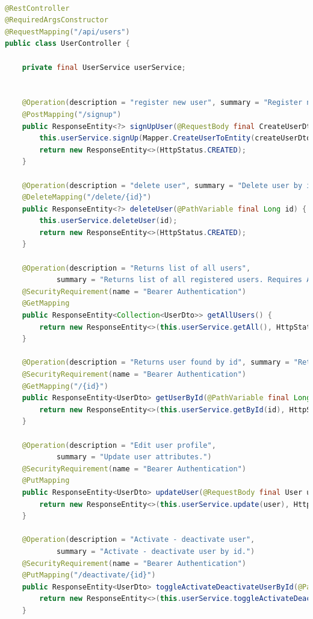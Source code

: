 \documentclass[a4paper,12pt,oneside]{article}
\begin{document}
\begin{lstlisting}[language=Java]

@RestController
@RequiredArgsConstructor
@RequestMapping("/api/users")
public class UserController {

    private final UserService userService;


    @Operation(description = "register new user", summary = "Register new user with provided attributes.")
    @PostMapping("/signup")
    public ResponseEntity<?> signUpUser(@RequestBody final CreateUserDto createUserDto) {
        this.userService.signUp(Mapper.CreateUserToEntity(createUserDto));
        return new ResponseEntity<>(HttpStatus.CREATED);
    }

    @Operation(description = "delete user", summary = "Delete user by id.")
    @DeleteMapping("/delete/{id}")
    public ResponseEntity<?> deleteUser(@PathVariable final Long id) {
        this.userService.deleteUser(id);
        return new ResponseEntity<>(HttpStatus.CREATED);
    }

    @Operation(description = "Returns list of all users",
            summary = "Returns list of all registered users. Requires Admin rights")
    @SecurityRequirement(name = "Bearer Authentication")
    @GetMapping
    public ResponseEntity<Collection<UserDto>> getAllUsers() {
        return new ResponseEntity<>(this.userService.getAll(), HttpStatus.OK);
    }

    @Operation(description = "Returns user found by id", summary = "Returns user found by id.")
    @SecurityRequirement(name = "Bearer Authentication")
    @GetMapping("/{id}")
    public ResponseEntity<UserDto> getUserById(@PathVariable final Long id) {
        return new ResponseEntity<>(this.userService.getById(id), HttpStatus.OK);
    }

    @Operation(description = "Edit user profile",
            summary = "Update user attributes.")
    @SecurityRequirement(name = "Bearer Authentication")
    @PutMapping
    public ResponseEntity<UserDto> updateUser(@RequestBody final User user) {
        return new ResponseEntity<>(this.userService.update(user), HttpStatus.OK);
    }

    @Operation(description = "Activate - deactivate user",
            summary = "Activate - deactivate user by id.")
    @SecurityRequirement(name = "Bearer Authentication")
    @PutMapping("/deactivate/{id}")
    public ResponseEntity<UserDto> toggleActivateDeactivateUserById(@PathVariable final Long id) {
        return new ResponseEntity<>(this.userService.toggleActivateDeactivate(id), HttpStatus.OK);
    }



\end{lstlisting}
\end{document}

